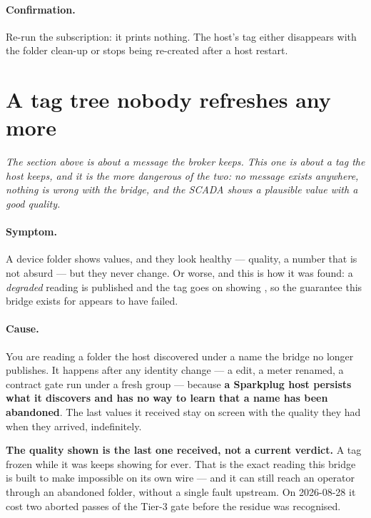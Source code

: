 \paragraph{Confirmation.} Re-run the  subscription: it prints nothing.
The host's tag either disappears with the folder clean-up or stops being re-created after a
host restart.

\section{A tag tree nobody refreshes any more}
\label{sec:trouble-abandoned-tree}

\emph{The section above is about a message the broker keeps. This one is about a tag the
\emph{host} keeps, and it is the more dangerous of the two: no message exists anywhere, nothing
is wrong with the bridge, and the SCADA shows a plausible value with a good quality.}

\paragraph{Symptom.} A device folder shows values, and they look healthy ---  quality,
a number that is not absurd --- but they never change. Or worse, and this is how it was found: a
\emph{degraded} reading is published and the tag goes on showing , so the guarantee
this bridge exists for appears to have failed.

\paragraph{Cause.} You are reading a folder the host discovered under a name the bridge no longer
publishes. It happens after any identity change --- a  edit, a meter renamed, a
contract gate run under a fresh group --- because \textbf{a Sparkplug host persists what it
discovers and has no way to learn that a name has been abandoned}. The last values it received stay
on screen with the quality they had when they arrived, indefinitely.

\begin{warning}
\textbf{The quality shown is the last one received, not a current verdict.} A tag frozen while it
was  keeps showing  for ever. That is the exact reading this bridge is built
to make impossible on its own wire --- and it can still reach an operator through an abandoned
folder, without a single fault upstream. On 2026-08-28 it cost two aborted passes of the Tier-3 gate
before the residue was recognised.
\end{warning}

